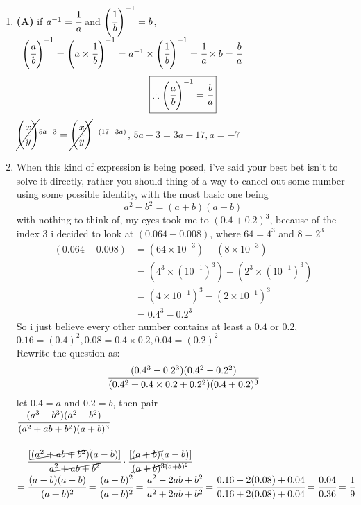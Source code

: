 \begin{multicols}{2}
\begin{enumerate}[label={\arabic*.}]
    \item \textbf{(A)} if $a^{-1} = \cfrac{1}{a}$ and $\left(\cfrac{1}{b}\right)^{-1} = b$,  $\hspace{5pt} \left(\cfrac{a}{b}\right)^{-1} = \left(a \times \cfrac{1}{b}\right)^{-1} = a^{-1} \times \left(\cfrac{1}{b}\right)^{-1} = \cfrac{1}{a} \times b = \cfrac{b}{a} $
    $$\boxed{ \therefore \left(\cfrac{a}{b}\right)^{-1} = \cfrac{b}{a}}$$
    $ \cancel{\left(\cfrac{x}{y}\right)}^{5a -3} = \cancel{\left(\cfrac{x}{y}\right)}^{-(17-3a)}$, $5a -3 = 3a -17, a = -7$
    \item When this kind of expression is being posed, i've said your best bet isn't to solve it directly, rather you should thing of a way to cancel out some number using some possible identity, with the most basic one being \\
     $$a^2 - b^2 = (a+b)(a-b)$$
    with nothing to think of, my eyes took me to $(0.4 +0.2)^3$, because of the index $3$ i decided to look at $(0.064 - 0.008)$, where $64 = 4^3$ and $8 = 2^3$ 
    \begin{align*}
    (0.064 - 0.008) &= (64 \times 10^{-3}) - (8 \times 10^{-3}) \\
    & = (4^3 \times (10^{-1})^3) - (2^3 \times (10^{-1})^3)  \\
   & = (4 \times 10^{-1})^{3} - (2 \times 10^{-1})^{3} \\
   & = 0.4^3 - 0.2^3
    \end{align*}
    So i just believe every other number contains at least a $0.4$ or $0.2$, $0.16 = (0.4)^2, 0.08 = 0.4 \times 0.2, 0.04 = (0.2)^2$ \\
    Rewrite the question as: 
    $$\cfrac{(0.4^3 - 0.2^3)(0.4^2 - 0.2^2)}{(0.4^2 + 0.4 \times 0.2 + 0.2^2)(0.4 + 0.2)^3}$$
    let $0.4 = a$ and $0.2 = b$, then pair \\
    $\cfrac{(a^3 - b^3)(a^2 - b^2)}{(a^2 + ab + b^2)(a + b)^3}$ \\\\
    $ = \cfrac{[\cancel{(a^2 + ab + b^2)}(a-b)]}{\cancel{a^2 + ab + b^2}} \cdot \cfrac{[\cancel{(a+b)}(a-b)]}{\cancel{(a+b)^3}^{(a+b)^2}} $ \\
    $ = \cfrac{(a-b)(a-b)}{(a+b)^2} = \cfrac{(a-b)^2}{(a+b)^2} = \cfrac{a^2 - 2ab + b^2}{a^2 + 2ab + b^2} = \cfrac{0.16 - 2(0.08) + 0.04}{0.16 + 2(0.08) + 0.04} = \cfrac{0.04}{0.36} = \cfrac{1}{9}$
    

\end{enumerate}
\end{multicols}
